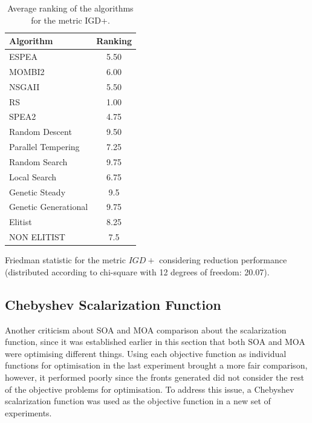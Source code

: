 
\begin{table}[H]
    \centering
    \begin{threeparttable}
    \begin{tabular}{lc}
    \hline
    Algorithm&Ranking\\
    \hline
    ESPEA&5.50\\
    MOMBI2&6.00\\
    NSGAII&5.50\\
    RS&1.00\\
    SPEA2&4.75\\
    Random Descent&9.50\\
    Parallel Tempering&7.25\\
    Random Search&9.75\\
    Local Search&6.75\\
    Genetic Steady&9.5\\
    Genetic Generational&9.75\\
    Elitist&8.25\\
    NON ELITIST&7.5\\
    \hline
    \end{tabular}
    \begin{tablenotes}
        \small
        \item Friedman statistic for the metric $IGD+$ considering reduction performance (distributed according to chi-square with 12 degrees of freedom: 20.07).\\
        \end{tablenotes}
    \end{threeparttable}
    \caption{Average ranking of the algorithms for the metric IGD+.}
    \label{tab:fried_mix_igd}
\end{table}

\subsection{Chebyshev Scalarization Function}

Another criticism about SOA and MOA comparison about the scalarization function, since it was established earlier in this section that both SOA and MOA were optimising different things. Using each objective function as individual functions for optimisation in the last experiment brought a more fair comparison, however, it performed poorly since the fronts generated did not consider the rest of the objective problems for optimisation. To address this issue, a Chebyshev scalarization function was used as the objective function in a new set of experiments.\\

